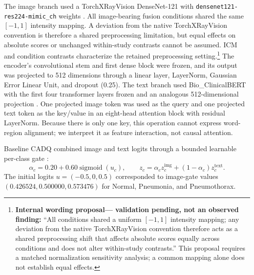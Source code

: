 \documentclass[a4paper,fleqn]{cas-sc}
\begin{document}
The image branch used a TorchXRayVision DenseNet-121 with
\texttt{densenet121-res224-mimic\_ch} weights
\cite{huang2017densenet,cohen2022torchxrayvision}. All image-bearing fusion
conditions shared the same $[-1,1]$ intensity mapping. A deviation from the
native TorchXRayVision convention is therefore a shared preprocessing
limitation, but equal effects on absolute scores or unchanged within-study
contrasts cannot be assumed. ICM and condition contrasts characterize the
retained preprocessing setting.\footnote{\textbf{Internal wording proposal---
validation pending, not an observed finding:} ``All conditions shared a uniform
$[-1,1]$ intensity mapping; any deviation from the native TorchXRayVision
convention therefore acts as a shared preprocessing shift that affects absolute
scores equally across conditions and does not alter within-study contrasts.''
This proposal requires a matched normalization sensitivity analysis; a common
mapping alone does not establish equal effects.}
The encoder's convolutional stem and
first dense block were frozen, and its output was projected to 512 dimensions
through a linear layer, LayerNorm, Gaussian Error Linear Unit, and dropout
(0.25). The text branch used Bio\_ClinicalBERT with the first four transformer
layers frozen and an analogous 512-dimensional projection
\cite{devlin2019bert,alsentzer2019clinicalbert}. One projected image token was
used as the query and one projected text token as the key/value in an eight-head
attention block with residual LayerNorm. Because there is only one key, this
operation cannot express word-region alignment; we interpret it as feature
interaction, not causal attention.

Baseline CADQ combined image and text logits through a bounded learnable
per-class gate \cite{arevalo2017gmu}:
\begin{equation}
\alpha_c=0.20+0.60\operatorname{sigmoid}(u_c),\qquad
z_c=\alpha_c z^{\mathrm{img}}_c+(1-\alpha_c)z^{\mathrm{text}}_c.
\end{equation}
The initial logits $u=(-0.5,0,0.5)$ corresponded to image-gate values
$(0.426524,0.500000,0.573476)$ for Normal, Pneumonia, and Pneumothorax.
\end{document}
